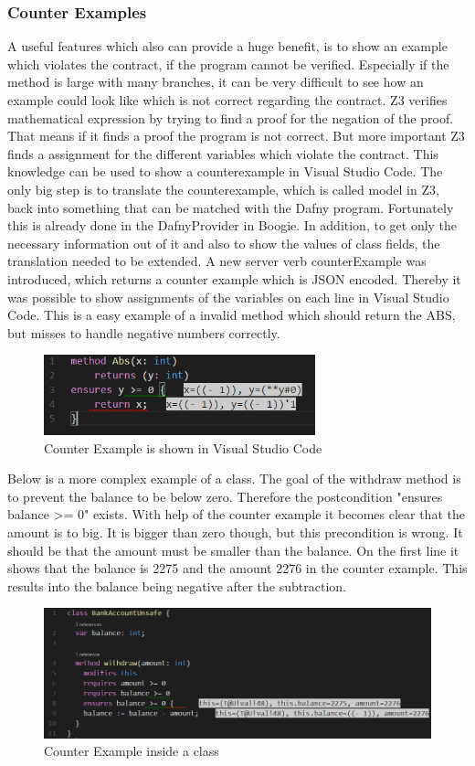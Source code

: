 \subsubsection{Counter Examples}
A useful features which also can provide a huge benefit, is to show an example which violates the contract, if the program cannot be verified. Especially if the method is large with many branches, it can be very difficult to see how an example could look like which is not correct regarding the contract. \newline
Z3 verifies mathematical expression by trying to find a proof for the negation of the proof. That means if it finds a proof the program is not correct. But more important Z3 finds a assignment for the different variables which violate the contract. This knowledge can be used to show a counterexample in Visual Studio Code. The only big step is to translate the counterexample, which is called model in Z3, back into something that can be matched with the Dafny program. Fortunately this is already done in the DafnyProvider in Boogie. In addition, to get only the necessary information out of it and also to show the values of class fields, the translation needed to be extended. A new server verb counterExample was introduced, which returns a counter example which is JSON encoded. Thereby it was possible to show assignments of the variables on each line in Visual Studio Code. \newline
This is a easy example of a invalid method which should return the ABS, but misses to handle negative numbers correctly. 
\begin{figure}[H]
	\centering
	\includegraphics[width=0.7\textwidth]{img/counterModel}
	\caption{Counter Example is shown in Visual Studio Code}
	\label{fig:counterModel}
\end{figure}
Below is a more complex example of a class. The goal of the withdraw method is to prevent the balance to be below zero. Therefore the postcondition "ensures balance >= 0" exists. With help of the counter example it becomes clear that the amount is to big. It is bigger than zero though, but this precondition is wrong. It should be that the amount must be smaller than the balance. On the first line it shows that the balance is 2275 and the amount 2276 in the counter example. This results into the balance being negative after the subtraction. 
\begin{figure}[H]
	\centering
	\includegraphics[width=1\textwidth]{img/counterModelBank}
	\caption{Counter Example inside a class}
	\label{fig:counterModelBank}
\end{figure}
